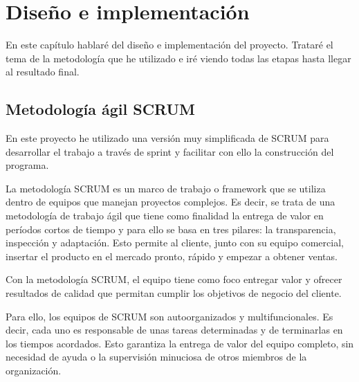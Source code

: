 \documentclass[a4paper, 12pt]{book}
\begin{document}
\cleardoublepage
\chapter{Diseño e implementación}

En este capítulo hablaré del diseño e implementación del proyecto. Trataré el tema de la metodología que he utilizado e iré viendo todas las etapas hasta llegar al resultado final.

\section{Metodología ágil SCRUM} 
\label{sec:met_agil}
En este proyecto he utilizado una versión muy simplificada de SCRUM para desarrollar el trabajo a través de sprint y facilitar con ello la construcción del programa.

La metodología SCRUM es un marco de trabajo o framework que se utiliza dentro de equipos que manejan proyectos complejos. Es decir, se trata de una metodología de trabajo ágil que tiene como finalidad la entrega de valor en períodos cortos de tiempo y para ello se basa en tres pilares: la transparencia, inspección y adaptación. Esto permite al cliente, junto con su equipo comercial, insertar el producto en el mercado pronto, rápido y empezar a obtener ventas.

Con la metodología SCRUM, el equipo tiene como foco entregar valor y ofrecer resultados de calidad que permitan cumplir los objetivos de negocio del cliente.

Para ello, los equipos de SCRUM son autoorganizados y multifuncionales. Es decir, cada uno es responsable de unas tareas determinadas y de terminarlas en los tiempos acordados. Esto garantiza la entrega de valor del equipo completo, sin necesidad de ayuda o la supervisión minuciosa de otros miembros de la organización.
\end{document}
